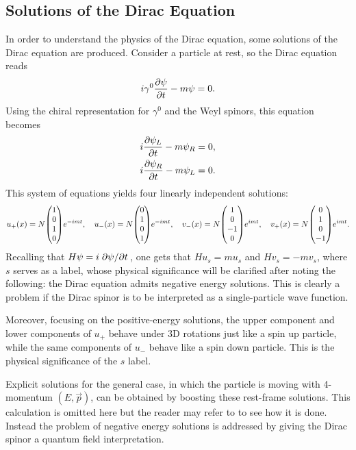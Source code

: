 \subsection{Solutions of the Dirac Equation}
In order to understand the physics of the Dirac equation, some solutions of the Dirac equation are produced. Consider a particle at rest, so the Dirac equation reads $$i\gamma^0\pdv{\psi}{t}-m\psi = 0.$$ Using the chiral representation for $\gamma^0$ and the Weyl spinors, this equation becomes
\begin{align*}
    i\pdv{\psi_L}{t}-m\psi_R &= 0, \\
    i\pdv{\psi_R}{t}-m\psi_L &= 0.
\end{align*}
This system of equations yields four linearly independent solutions: $$u_{+}(x)= N\mqty(1 \\ 0 \\ 1 \\ 0)e^{-imt}\qc u_{-}(x)= N\mqty(0 \\ 1 \\ 0 \\ 1)e^{-imt}\qc v_{-}(x)= N\mqty(1 \\ 0 \\ -1 \\ 0)e^{imt}\qc v_{+}(x)= N\mqty(0 \\ 1 \\ 0 \\ -1)e^{imt}. $$ Recalling that $H\psi = i\pdv*{\psi}{t}$, one gets that $H u_{s} = mu_{s}$ and $H v_{s} = -mv_{s}$, where $s$ serves as a label, whose physical significance will be clarified after noting the following: the Dirac equation admits negative energy solutions. This is clearly a problem if the Dirac spinor is to be interpreted as a single-particle wave function.

Moreover, focusing on the positive-energy solutions, the upper component and lower components of $u_{+}$ behave under 3D rotations just like a spin up particle, while the same components of $u_{-}$ behave like a spin down particle. This is the physical significance of the $s$ label.

Explicit solutions for the general case, in which the particle is moving with 4-momentum $(E,\vec{p})$, can be obtained by boosting these rest-frame solutions. This calculation is omitted here but the reader may refer to \cite{peskin_introduction_1995} to see how it is done. Instead the problem of negative energy solutions is addressed by giving the Dirac spinor a quantum field interpretation.

